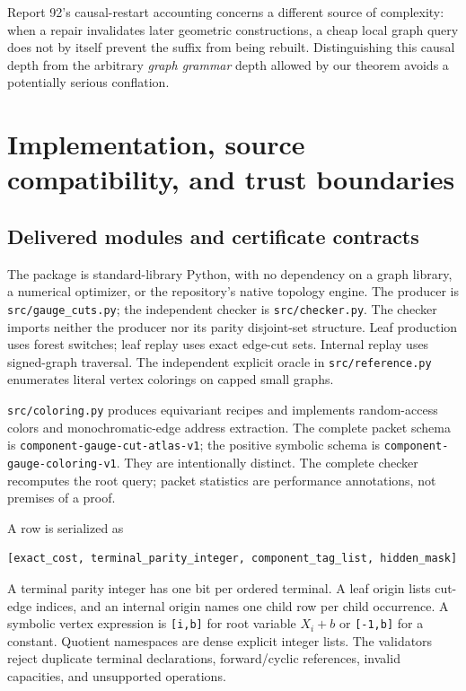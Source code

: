 \documentclass[11pt,letterpaper]{article}
\theoremstyle{definition}
\theoremstyle{remark}\newtheorem{remark}[theorem]{Remark}
\DeclareRobustCommand{\code}[1]{\nolinkurl{#1}}
\begin{document}
Report 92's causal-restart accounting \cite{causal} concerns a different source of complexity: when a repair invalidates later geometric constructions, a cheap local graph query does not by itself prevent the suffix from being rebuilt. Distinguishing this causal depth from the arbitrary \emph{graph grammar} depth allowed by our theorem avoids a potentially serious conflation.

\section{Implementation, source compatibility, and trust boundaries}
\label{sec:software}
\subsection{Delivered modules and certificate contracts}
The package is standard-library Python, with no dependency on a graph library, a numerical optimizer, or the repository's native topology engine. The producer is \code{src/gauge_cuts.py}; the independent checker is \code{src/checker.py}. The checker imports neither the producer nor its parity disjoint-set structure. Leaf production uses forest switches; leaf replay uses exact edge-cut sets. Internal replay uses signed-graph traversal. The independent explicit oracle in \code{src/reference.py} enumerates literal vertex colorings on capped small graphs.

\code{src/coloring.py} produces equivariant recipes and implements random-access colors and monochromatic-edge address extraction. The complete packet schema is \code{component-gauge-cut-atlas-v1}; the positive symbolic schema is \code{component-gauge-coloring-v1}. They are intentionally distinct. The complete checker recomputes the root query; packet statistics are performance annotations, not premises of a proof.

A row is serialized as
\begin{lstlisting}
[exact_cost, terminal_parity_integer, component_tag_list, hidden_mask]
\end{lstlisting}
A terminal parity integer has one bit per ordered terminal. A leaf origin lists cut-edge indices, and an internal origin names one child row per child occurrence. A symbolic vertex expression is \code{[i,b]} for root variable $X_i+b$ or \code{[-1,b]} for a constant. Quotient namespaces are dense explicit integer lists. The validators reject duplicate terminal declarations, forward/cyclic references, invalid capacities, and unsupported operations.
\end{document}
